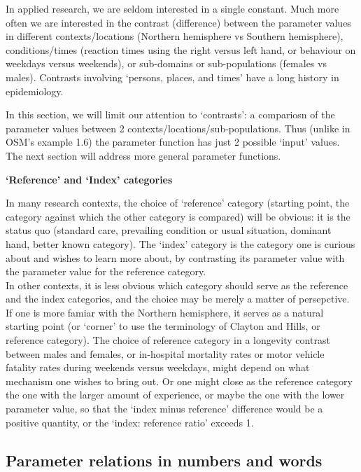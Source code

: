 \documentclass[]{book}
\begin{document}
In applied research, we are seldom interested in a single constant. Much more often we are interested in the contrast (difference) between the parameter values in different contexts/locations (Northern hemisphere vs Southern hemisphere), conditions/times (reaction times using the right versus left hand, or behaviour on weekdays versus weekends), or sub-domains or sub-populations (females vs males). Contrasts involving `persons, places, and times' have a long history in epidemiology.

In this section, we will limit our attention to `contrasts': a compariosn of the parameter values between 2 contexts/locations/sub-populations. Thus (unlike in OSM's example 1.6) the parameter function has just 2 possible `input' values. The next section will address more general parameter functions.

\textbf{`Reference' and `Index' categories}

In many research contexts, the choice of `reference' category (starting point, the category against which the other category is compared) will be obvious: it is the status quo (standard care, prevailing condition or usual situation, dominant hand, better known category). The `index' category is the category one is curious about and wishes to learn more about, by contrasting its parameter value with the parameter value for the reference category.\\
\hspace*{0.333em}\hspace*{0.333em}\hspace*{0.333em}\hspace*{0.333em}In other contexts, it is less obvious which category should serve as the reference and the index categories, and the choice may be merely a matter of persepctive. If one is more famiar with the Northern hemisphere, it serves as a natural starting point (or `corner' to use the terminology of Clayton and Hills, or reference category). The choice of reference category in a longevity contrast between males and females, or in-hospital mortality rates or motor vehicle fatality rates during weekends versus weekdays, might depend on what mechanism one wishes to bring out. Or one might close as the reference category the one with the larger amount of experience, or maybe the one with the lower parameter value, so that the `index minus reference' difference would be a positive quantity, or the `index: reference ratio' exceeds 1.

\hypertarget{parameter-relations-in-numbers-and-words}{%
\subsection{Parameter relations in numbers and words}\label{parameter-relations-in-numbers-and-words}}
\end{document}

